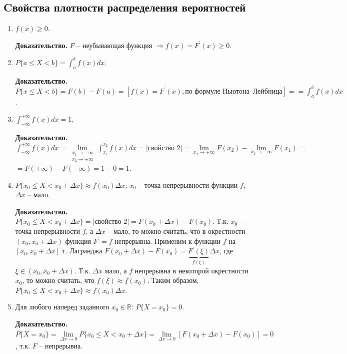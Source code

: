 \subsection*{Cвойства плотности распределения вероятностей}
\begin{enumerate}
	\item $f(x) \geq 0$.
	
		\textbf{Доказательство.} $F$ -- неубывающая функция $\Rightarrow f(x) = F^\text{'}(x) \geq 0$.
	
	\item $P\{a \leq X < b\} = \int_{a}^{b}f(x)dx$.
	
		\textbf{Доказательство.} $P\{x \leq X < b\} = F(b) - F(a) = [f(x)=F^\text{'}(x); \text{по формуле Ньютона--Лейбница}] = \text{$=$}\int_{a}^{b}f(x)dx$. 
	
	\item $\int_{-\infty}^{+\infty}f(x)dx = 1$.
	
		\textbf{Доказательство.} $\int_{-\infty}^{+\infty}f(x)dx = \lim\limits_{\substack{x_1 \rightarrow -\infty \\ x_2 \rightarrow +\infty}} \int_{x_1}^{x_2}f(x)dx = |\text{свойство 2}| = \lim\limits_{x_2 \rightarrow +\infty}F(x_2) - \lim\limits_{x_1 \rightarrow -\infty}F(x_1) =$ $=F(+\infty)-F(-\infty)=1-0=1$.
	
	\item $P\{x_0 \leq X < x_0 + \Delta x\} \approx f(x_0)\Delta x$; $x_0$ -- точка непрерывности функции $f$, $\Delta x$ -- мало.
	
		\textbf{Доказательство.} $P\{x_0 \leq X < x_0 + \Delta x\} = |\text{свойство 2}| = F(x_0 + \Delta x) - F(x_0)$. Т.к. $x_0$ -- точка непрерывности $f$, а $\Delta x$ -- мало, то можно считать, что в окрестности $(x_0, x_0 + \Delta x)$ функция $F^\text{'} = f$ непрерывна. Применим к функции $f$ на $[x_0, x_0 + \Delta x]$ т. Лагранджа $F(x_0 + \Delta x) - F(x_0) = \underbrace{F^\text{'}(\xi)}_\text{$f(\xi)$}\Delta x$, где $\xi \in (x_0, x_0 + \Delta x)$. Т.к. $\Delta x$ мало, а $f$ непрерывна в некоторой окрестности $x_0$, то можно считать, что $f(\xi) \approx f(x_0)$. Таким образом, $P\{x_0 \leq X < x_0 + \Delta x\} \approx f(x_0)\Delta x$.
	
	\item Для любого наперед заданного $x_0 \in \mathbb{R}$: $P\{X = x_0\} = 0$.
	
		\textbf{Доказательство.} $P\{X=x_0\}=\lim\limits_{\Delta x \rightarrow 0} P\{x_0 \leq X < x_0 + \Delta x\} = \lim\limits_{\Delta x \rightarrow 0}[F(x_0 + \Delta x) - F(x_0)] = 0$, т.к. $F$ -- непрерывна.
		
\end{enumerate}

